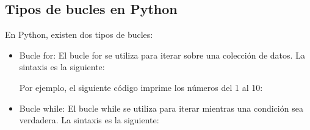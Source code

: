 \subsection{Tipos de bucles en Python}
En Python, existen dos tipos de bucles:
\begin{itemize}
    \item Bucle for: El bucle for se utiliza para iterar sobre una colección de datos. La sintaxis es la siguiente: 
    \begin{figure}[h]
        \centering
      \end{figure}

      Por ejemplo, el siguiente código imprime los números del 1 al 10:
      \begin{figure}[h]
        \centering
      \end{figure}
\newpage
    \item Bucle while: El bucle while se utiliza para iterar mientras una condición sea verdadera. La sintaxis es la siguiente:
    \begin{figure}[h]
        \centering
      \end{figure}


\end{itemize}
